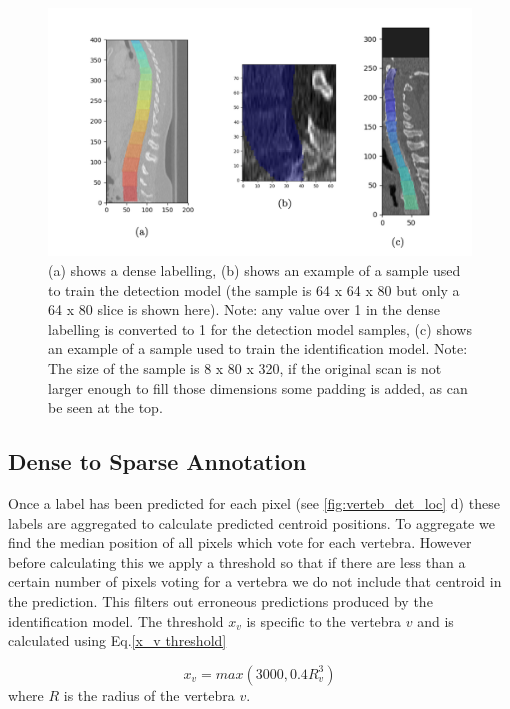 \begin{figure}[!h]
\begin{center}
\includegraphics[width=.5\linewidth]{images/annotated_scan.png}
\caption {(a) shows a dense labelling, (b) shows an example of a sample used to train the detection model (the sample is 64 x 64 x 80 but only a 64 x 80 slice is shown here). Note: any value over 1 in the dense labelling is converted to 1 for the detection model samples, (c) shows an example of a sample used to train the identification model. Note: The size of the sample is 8 x 80 x 320, if the original scan is not larger enough to fill those dimensions some padding is added, as can be seen at the top.} 
\label{fig:annotated_scan}
\end{center}
\end{figure}


\subsection{Dense to Sparse Annotation}
Once a label has been predicted for each pixel (see \ref{fig:verteb_det_loc} d) these labels are aggregated to calculate predicted centroid positions. To aggregate we find the median position of all pixels which vote for each vertebra. However before calculating this we apply a threshold so that if there are less than a certain number of pixels voting for a vertebra we do not include that centroid in the prediction. This filters out erroneous predictions produced by the identification model.
The threshold $x_v$ is specific to the vertebra $v$ and is calculated using Eq.\ref{x_v threshold}

\begin{equation}\label{x_v threshold}
x_v = max(3000, 0.4R_v^3)
\end{equation}
where $R$ is the radius of the vertebra $v$. 